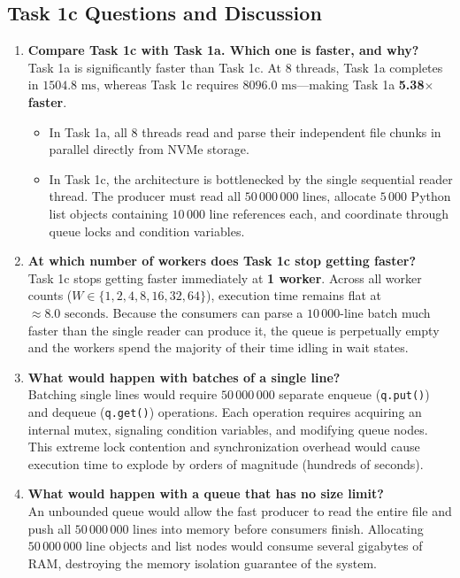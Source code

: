 \documentclass{labreport}
\begin{document}
\subsection{Task 1c Questions and Discussion}
\begin{enumerate}
    \item \textbf{Compare Task 1c with Task 1a. Which one is faster, and why?}\\
    Task 1a is significantly faster than Task 1c. At 8 threads, Task 1a completes in \textbf{$1504.8\text{ ms}$}, whereas Task 1c requires \textbf{$8096.0\text{ ms}$}---making Task 1a \textbf{5.38$\times$ faster}.
    \begin{itemize}
        \item In Task 1a, all 8 threads read and parse their independent file chunks in parallel directly from NVMe storage.
        \item In Task 1c, the architecture is bottlenecked by the single sequential reader thread. The producer must read all $50\,000\,000$ lines, allocate $5\,000$ Python list objects containing $10\,000$ line references each, and coordinate through queue locks and condition variables.
    \end{itemize}

    \item \textbf{At which number of workers does Task 1c stop getting faster?}\\
    Task 1c stops getting faster immediately at \textbf{1 worker}. Across all worker counts ($W \in \{1, 2, 4, 8, 16, 32, 64\}$), execution time remains flat at $\approx 8.0\text{ seconds}$. Because the consumers can parse a $10\,000$-line batch much faster than the single reader can produce it, the queue is perpetually empty and the workers spend the majority of their time idling in wait states.

    \item \textbf{What would happen with batches of a single line?}\\
    Batching single lines would require $50\,000\,000$ separate enqueue (\texttt{q.put()}) and dequeue (\texttt{q.get()}) operations. Each operation requires acquiring an internal mutex, signaling condition variables, and modifying queue nodes. This extreme lock contention and synchronization overhead would cause execution time to explode by orders of magnitude (hundreds of seconds).

    \item \textbf{What would happen with a queue that has no size limit?}\\
    An unbounded queue would allow the fast producer to read the entire file and push all $50\,000\,000$ lines into memory before consumers finish. Allocating $50\,000\,000$ line objects and list nodes would consume several gigabytes of RAM, destroying the memory isolation guarantee of the system.
\end{enumerate}
\end{document}
